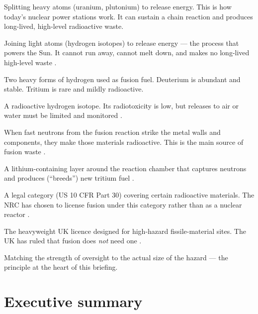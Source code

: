 \documentclass[11pt,a4paper]{article}
\begin{document}
\begin{description}[leftmargin=1.4em,style=nextline]
  \item[Fission] Splitting heavy atoms (uranium, plutonium) to release energy.
  This is how today's nuclear power stations work. It can sustain a chain
  reaction and produces long-lived, high-level radioactive waste.
  \item[Fusion] Joining light atoms (hydrogen isotopes) to release energy --- the
  process that powers the Sun. It cannot run away, cannot melt down, and makes no
  long-lived high-level waste \citep{ukfusionregfactsheet}.
  \item[Deuterium and tritium] Two heavy forms of hydrogen used as fusion fuel.
  Deuterium is abundant and stable. Tritium is rare and mildly radioactive.
  \item[Tritium] A radioactive hydrogen isotope. Its radiotoxicity is low, but
  releases to air or water must be limited and monitored \citep{tritiumbreeding2018}.
  \item[Activation / activated material] When fast neutrons from the fusion
  reaction strike the metal walls and components, they make those materials
  radioactive. This is the main source of fusion waste \citep{radwasterecycling2023}.
  \item[Breeding blanket] A lithium-containing layer around the reaction chamber
  that captures neutrons and produces (``breeds'') new tritium fuel
  \citep{iaeatecdoc2049}.
  \item[Byproduct material] A legal category (US 10 CFR Part 30) covering certain
  radioactive materials. The NRC has chosen to license fusion under this category
  rather than as a nuclear reactor \citep{nrc2023vote,cfr10part30}.
  \item[Nuclear site licence] The heavyweight UK licence designed for
  high-hazard fissile-material sites. The UK has ruled that fusion does
  \emph{not} need one \citep{ukfusionregfactsheet}.
  \item[Proportionate regulation] Matching the strength of oversight to the
  actual size of the hazard --- the principle at the heart of this briefing.
\end{description}
\newpage

\section{Executive summary}
\label{sec:exec}
\end{document}
